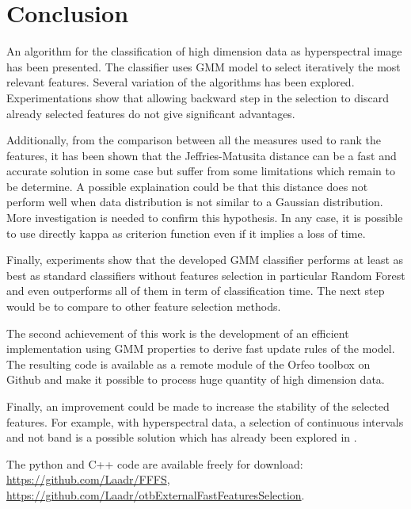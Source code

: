 \documentclass[journal,peerreview,onecolumn]{IEEEtran}
\begin{document}
\section{Conclusion}

An algorithm for the classification of high dimension data as hyperspectral image has been presented. The classifier uses GMM model to select iteratively the most relevant features. Several variation of the algorithms has been explored. Experimentations show that allowing backward step in the selection to discard already selected features do not give significant advantages.

Additionally, from the comparison between all the measures used to rank the features, it has been shown that the Jeffries-Matusita distance can be a fast and accurate solution in some case but suffer from some limitations which remain to be determine. A possible explaination could be that this distance does not perform well when data distribution is not similar to a Gaussian distribution. More investigation is needed to confirm this hypothesis. In any case, it is possible to use directly kappa as criterion function even if it implies a loss of time.

Finally, experiments show that the developed GMM classifier performs at least as best as standard classifiers without features selection in particular Random Forest and even outperforms all of them in term of classification time. The next step would be to compare to other feature selection methods.

The second achievement of this work is the development of an efficient implementation using GMM properties to derive fast update rules of the model. The resulting code is available as a remote module of the Orfeo toolbox on Github and make it possible to process huge quantity of high dimension data.

Finally, an improvement could be made to increase the stability of the selected features. For example, with hyperspectral data, a selection of continuous intervals and not band is a possible solution which has already been explored in \cite{serpico2007extraction}.

The python and C++ code are available freely for download: \url{https://github.com/Laadr/FFFS}, \url{https://github.com/Laadr/otbExternalFastFeaturesSelection}.

\appendices
\section{}
\label{app:proof-update}
\end{document}
